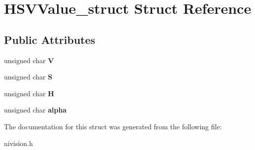 \hypertarget{structHSVValue__struct}{\section{\-H\-S\-V\-Value\-\_\-struct \-Struct \-Reference}
\label{structHSVValue__struct}
}
\subsection*{\-Public \-Attributes}
\begin{DoxyCompactItemize}
\item 
\hypertarget{structHSVValue__struct_a8965f5bd36d7372cac50b52dd27d0a89}{unsigned char {\bfseries \-V}}\label{structHSVValue__struct_a8965f5bd36d7372cac50b52dd27d0a89}

\item 
\hypertarget{structHSVValue__struct_a79e9ec0ede08c4425a16909dc38c64dc}{unsigned char {\bfseries \-S}}\label{structHSVValue__struct_a79e9ec0ede08c4425a16909dc38c64dc}

\item 
\hypertarget{structHSVValue__struct_a0de416983c14baaab8f2bdd1e297fd3a}{unsigned char {\bfseries \-H}}\label{structHSVValue__struct_a0de416983c14baaab8f2bdd1e297fd3a}

\item 
\hypertarget{structHSVValue__struct_afce8f1a727f2fdddadc25d30a4897f2c}{unsigned char {\bfseries alpha}}\label{structHSVValue__struct_afce8f1a727f2fdddadc25d30a4897f2c}

\end{DoxyCompactItemize}


\-The documentation for this struct was generated from the following file\-:\begin{DoxyCompactItemize}
\item 
nivision.\-h\end{DoxyCompactItemize}
